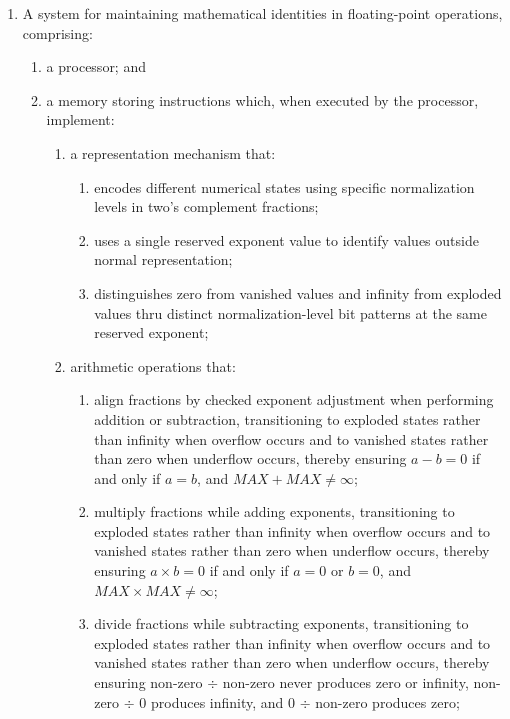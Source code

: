 \documentclass[12pt,letter]{article}
\begin{document}
\begin{enumerate}
\newpage
    \item A system for maintaining mathematical identities in floating-point operations, comprising:
        \begin{enumerate}
            \item a processor; and
            \item a memory storing instructions which, when executed by the processor, implement:
                \begin{enumerate}
                    \item a representation mechanism that:
                        \begin{enumerate}
                            \item encodes different numerical states using specific normalization levels in two's complement fractions;
                            \item uses a single reserved exponent value to identify values outside normal representation;
                            \item distinguishes zero from vanished values and infinity from exploded values thru distinct normalization-level bit patterns at the same reserved exponent;
                        \end{enumerate}
                    \item arithmetic operations that:
                        \begin{enumerate}
                            \item align fractions by checked exponent adjustment when performing addition or subtraction, transitioning to exploded states rather than infinity when overflow occurs and to vanished states rather than zero when underflow occurs, thereby ensuring $a - b = 0$ if and only if $a = b$, and $MAX + MAX \neq \infty$;
                            \item multiply fractions while adding exponents, transitioning to exploded states rather than infinity when overflow occurs and to vanished states rather than zero when underflow occurs, thereby ensuring $a \times b = 0$ if and only if $a = 0$ or $b = 0$, and $MAX \times MAX \neq \infty$;
                            \item divide fractions while subtracting exponents, transitioning to exploded states rather than infinity when overflow occurs and to vanished states rather than zero when underflow occurs, thereby ensuring non-zero $\div$ non-zero never produces zero or infinity, non-zero $\div$ 0 produces infinity, and 0 $\div$ non-zero produces zero;

\end{enumerate}
\end{enumerate}
\end{enumerate}
\end{enumerate}
\end{document}
